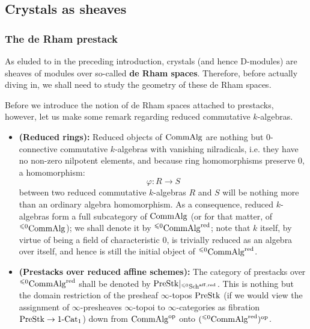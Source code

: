         \subsection{Crystals as sheaves}
            \subsubsection{The de Rham prestack}
                As eluded to in the preceding introduction, crystals (and hence D-modules) are sheaves of modules over so-called \textbf{de Rham spaces}. Therefore, before actually diving in, we shall need to study the geometry of these de Rham spaces.
            
                Before we introduce the notion of de Rham spaces attached to prestacks, however, let us make some remark regarding reduced commutative $k$-algebras. 
                \begin{remark} \label{remark: reduced_affine_schemes}
                    \noindent
                    \begin{itemize}
                        \item \textbf{(Reduced rings):} Reduced objects of $\mathrm{Comm}\mathrm{Alg}$ are nothing but $0$-connective commutative $k$-algebras with vanishing nilradicals, i.e. they have no non-zero nilpotent elements, and because ring homomorphisms preserve $0$, a homomorphism:
                            $$\varphi: R \to S$$
                        between two reduced commutative $k$-algebras $R$ and $S$ will be nothing more than an ordinary algebra homomorphism. As a consequence, reduced $k$-algebras form a full subcategory of $\mathrm{Comm}\mathrm{Alg}$ (or for that matter, of ${}^{\leqslant 0}\mathrm{Comm}\mathrm{Alg}$); we shall denote it by ${}^{\leqslant 0}\mathrm{Comm}\mathrm{Alg}^{\mathrm{red}}$; note that $k$ itself, by virtue of being a field of characteristic $0$, is trivially reduced as an algebra over itself, and hence is still the initial object of ${}^{\leqslant 0}\mathrm{Comm}\mathrm{Alg}^{\mathrm{red}}$. 
                        \item \textbf{(Prestacks over reduced affine schemes):} The category of prestacks over ${}^{\leqslant 0}\mathrm{Comm}\mathrm{Alg}^{\mathrm{red}}$ shall be denoted by $\mathrm{Pre}\mathrm{Stk}|_{{}^{\leqslant 0}\mathrm{Sch}^{\mathrm{aff}, \mathrm{red}}}$. This is nothing but the domain restriction of the presheaf $\infty$-topos $\mathrm{Pre}\mathrm{Stk}$ (if we would view the assignment of $\infty$-presheaves $\infty$-topoi to $\infty$-categories as fibration $\mathrm{Pre}\mathrm{Stk} \to 1\text{-}\mathrm{Cat}_1$) down from $\mathrm{Comm}\mathrm{Alg}^{\mathrm{op}}$ onto $({}^{\leqslant 0}\mathrm{Comm}\mathrm{Alg}^{\mathrm{red}})^{\mathrm{op}}$. 
                    \end{itemize}
                \end{remark}
                
